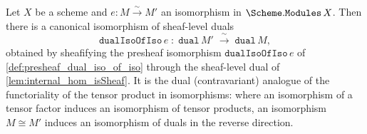 \begin{definition}


  \label{def:scheme_modules_dual_iso_of_iso}
  Let \(X\) be a scheme and \(e : M \xrightarrow{\sim} M'\) an isomorphism in
  \(\Scheme.\mathtt{Modules}\,X\). Then there is a canonical isomorphism of sheaf-level
  duals
  \[
    \mathtt{dualIsoOfIso}\,e \;\colon\; \mathtt{dual}\,M' \;\xrightarrow{\ \sim\ }\;
      \mathtt{dual}\,M,
  \]
  obtained by sheafifying the presheaf isomorphism \(\mathtt{dualIsoOfIso}\,e\) of
  \cref{def:presheaf_dual_iso_of_iso} through the sheaf-level dual of
  \cref{lem:internal_hom_isSheaf}. It is the dual (contravariant) analogue of the
  functoriality of the tensor product in isomorphisms: where an isomorphism of a tensor
  factor induces an isomorphism of tensor products, an isomorphism \(M \cong M'\)
  induces an isomorphism of duals in the reverse direction.
\end{definition}

